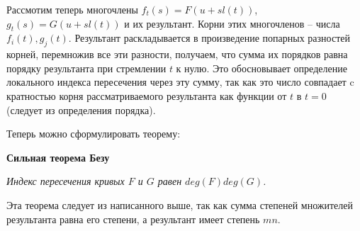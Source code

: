 \documentclass[a4paper, 12pt]{article}
\begin{document}
Рассмотим теперь многочлены $f_t(s) = F(u + sl(t))$, $g_t(s) = G(u + sl(t))$ и их результант. Корни этих многочленов -- числа $f_i(t), g_j(t)$. Результант раскладывается в произведение попарных разностей корней, перемножив все эти разности, получаем, что сумма их порядков равна порядку результанта при стремлении $t$ к нулю.\newline
Это обосновывает определение локального индекса пересечения через эту сумму, так как это число совпадает c кратностью корня рассматриваемого результанта как функции от $t$ в $t=0$ (следует из определения порядка).


Теперь можно сформулировать теорему:

\textbf{Сильная теорема Безу}\newline

\textit{Индекс пересечения кривых $F$ и $G$ равен $deg(F)deg(G)$.}

Эта теорема следует из написанного выше, так как сумма степеней множителей результанта равна его степени, а результант имеет степень $mn$.
\end{document}
